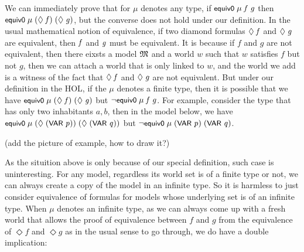 \documentclass[letterpaper]{article}
\renewcommand{\HOLConst}[1]{{\textsf{\upshape\small #1}}}
\renewcommand{\HOLinline}[1]{\ensuremath{#1}}
\begin{document}
We can immediately prove that for $\mu$ denotes any type, if \HOLinline{\HOLConst{equiv0}\;\HOLFreeVar{\ensuremath{\mu}}\;\HOLFreeVar{f}\;\HOLFreeVar{g}} then \HOLinline{\HOLConst{equiv0}\;\HOLFreeVar{\ensuremath{\mu}}\;(\HOLSymConst{\ensuremath{\Diamond}}\;\HOLFreeVar{f})\;(\HOLSymConst{\ensuremath{\Diamond}}\;\HOLFreeVar{g})}, but the converse does not hold under our definition. In the usual mathematical notion of equivalence, if two diamond formulas \HOLinline{\HOLSymConst{\ensuremath{\Diamond}}\;\HOLFreeVar{f}} and \HOLinline{\HOLSymConst{\ensuremath{\Diamond}}\;\HOLFreeVar{g}} are equivalent, then \HOLinline{\HOLFreeVar{f}} and \HOLinline{\HOLFreeVar{g}} must be equivalent. It is because if $f$ and $g$ are not equivalent, then there eixsts a model \HOLinline{\HOLFreeVar{\ensuremath{\mathfrak{M}}}} and a world $w$ such that $w$ satisfies $f$ but not $g$, then we can attach a world that is only linked to $w$, and the world we add is a witness of the fact that \HOLinline{\HOLSymConst{\ensuremath{\Diamond}}\;\HOLFreeVar{f}} and \HOLinline{\HOLSymConst{\ensuremath{\Diamond}}\;\HOLFreeVar{g}} are not equivalent. But under our definition in the HOL, if the $\mu$ denotes a finite type, then it is possible that we have \HOLinline{\HOLConst{equiv0}\;\HOLFreeVar{\ensuremath{\mu}}\;(\HOLSymConst{\ensuremath{\Diamond}}\;\HOLFreeVar{f})\;(\HOLSymConst{\ensuremath{\Diamond}}\;\HOLFreeVar{g})} but \HOLinline{\HOLSymConst{\HOLTokenNeg{}}\HOLConst{equiv0}\;\HOLFreeVar{\ensuremath{\mu}}\;\HOLFreeVar{f}\;\HOLFreeVar{g}}. For example, consider the type that has only two inhabitants $a,b$, then in the model below, we have \HOLinline{\HOLConst{equiv0}\;\HOLFreeVar{\ensuremath{\mu}}\;(\HOLSymConst{\ensuremath{\Diamond}}\;(\HOLConst{VAR}\;\HOLFreeVar{p}))\;(\HOLSymConst{\ensuremath{\Diamond}}\;(\HOLConst{VAR}\;\HOLFreeVar{q}))} but \HOLinline{\HOLSymConst{\HOLTokenNeg{}}\HOLConst{equiv0}\;\HOLFreeVar{\ensuremath{\mu}}\;(\HOLConst{VAR}\;\HOLFreeVar{p})\;(\HOLConst{VAR}\;\HOLFreeVar{q})}.

(add the picture of example, how to draw it?)

As the situition above is only because of our special definition, such case is uninteresting. For any model, regardless its world set is of a finite type or not, we can always create a copy of the model in an infinite type. So it is harmless to just consider equivalence of formulas for models whose underlying set is of an infinite type. When $\mu$ denotes an infinite type, as we can always come up with a fresh world that allows the proof of equivalence between $f$ and $g$ from the equivalence of $\Diamond f$ and $\Diamond g$ as in the usual sense to go through, we do have a double implication:
\end{document}
